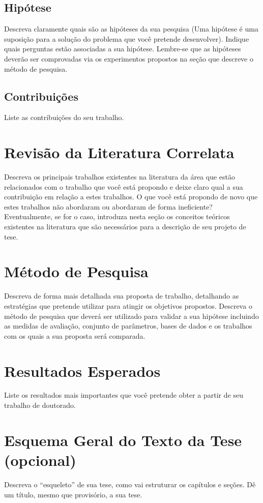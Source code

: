 \documentclass[12pt]{article}
\begin{document}
\subsection{Hipótese}
Descreva claramente quais são as hipóteses da sua pesquisa (Uma hipótese é uma suposição para a solução do problema que você pretende desenvolver). Indique quais perguntas estão associadas a sua hipótese. Lembre-se que as hipóteses deverão ser comprovadas via os experimentos propostos na seção que descreve o método de pesquisa.

\subsection{Contribuições}
Liste as contribuições do seu trabalho. 

\section{Revisão da Literatura Correlata}
Descreva os principais trabalhos existentes na literatura da área que estão relacionados com o trabalho que você está propondo e deixe claro qual a sua contribuição em relação a estes trabalhos. O que você está propondo de novo que estes trabalhos não abordaram ou abordaram de forma ineficiente? Eventualmente, se for o caso, introduza nesta seção os conceitos teóricos existentes na literatura que são necessários para a descrição de seu projeto de tese.

\section{Método de Pesquisa}
Descreva de forma mais detalhada sua proposta de trabalho, detalhando as estratégias que pretende utilizar para atingir os objetivos propostos. Descreva o método de pesquisa que deverá ser utilizado para validar a sua hipótese incluindo as medidas de avaliação, conjunto de parâmetros, bases de dados e os trabalhos com os quais a sua proposta será comparada.

\section{Resultados Esperados}
Liste os resultados mais importantes que você pretende obter a partir de seu trabalho de doutorado.

\section{Esquema Geral do Texto da Tese (opcional)}
Descreva o “esqueleto” de sua tese, como vai estruturar os capítulos e seções. Dê um título, mesmo que provisório, a sua tese.
\end{document}

